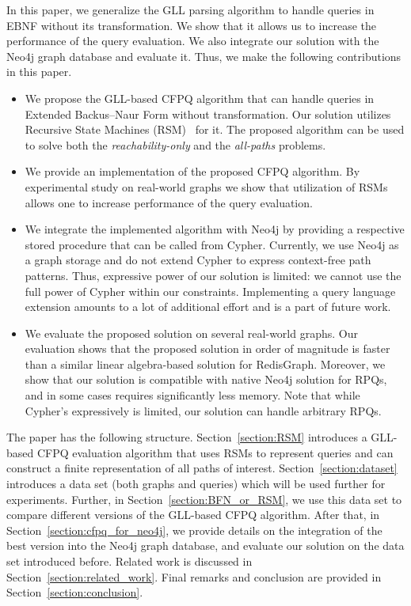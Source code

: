 \documentclass[
11pt,%
tightenlines,%
twoside,%
onecolumn,%
nobibnotes,%
nofootinbib,%
superscriptaddress,%
noshowpacs,%
longbibliography,%
centertags]%
{revtex4-2}
\begin{document}
In this paper, we generalize the GLL parsing algorithm to handle queries in EBNF without its transformation. We show that it allows us to increase the performance of the query evaluation. We also integrate our solution with the Neo4j graph database and evaluate it. Thus, we make the following contributions in this paper.
\begin{itemize}
    \item We propose the GLL-based CFPQ algorithm that can handle queries in Extended Backus--Naur Form without transformation. Our solution utilizes Recursive State Machines (RSM)~\cite{10.1145/1075382.1075387} for it. The proposed algorithm can be used to solve both the \textit{reachability-only} and the \textit{all-paths} problems.
    \item We provide an implementation of the proposed CFPQ algorithm. By experimental study on real-world graphs we show that utilization of RSMs allows one to increase performance of the query evaluation. 
    \item We integrate the implemented algorithm with Neo4j by providing a respective stored procedure that can be called from Cypher. Currently, we use Neo4j as a graph storage and do not extend Cypher to express context-free path patterns. Thus, expressive power of our solution is limited: we cannot use the full power of Cypher within our constraints. Implementing a query language extension amounts to a lot of additional effort and is a part of future work.
    \item We evaluate the proposed solution on several real-world graphs. Our evaluation shows that the proposed solution in order of magnitude is faster than a similar linear algebra-based solution for RedisGraph. Moreover, we show that our solution is compatible with native Neo4j solution for RPQs, and in some cases requires significantly less memory. Note that while Cypher's expressively is limited, our solution can handle arbitrary RPQs.
\end{itemize}

The paper has the following structure.
Section~\ref{section:RSM} introduces a GLL-based CFPQ evaluation algorithm that uses RSMs to represent queries and can construct a finite representation of all paths of interest. 
Section~\ref{section:dataset} introduces a data set (both graphs and queries) which will be used further for experiments.
Further, in Section~\ref{section:BFN_or_RSM}, we use this data set to compare different versions of the GLL-based CFPQ algorithm.
After that, in Section~\ref{section:cfpq_for_neo4j}, we provide details on the integration of the best version into the Neo4j graph database, and evaluate our solution on the data set introduced before.
Related work is discussed in Section~\ref{section:related_work}. Final remarks and conclusion are provided in Section~\ref{section:conclusion}.
\end{document}
